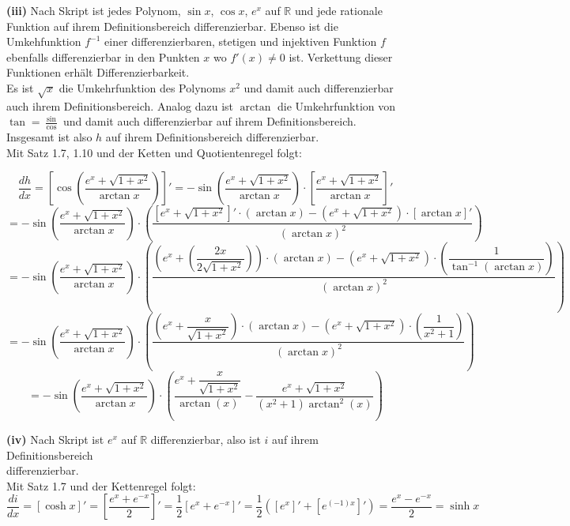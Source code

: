 \documentclass[a4paper,graphics,11pt]{article}
\begin{document}
\textbf{(iii)}
Nach Skript ist jedes Polynom, $\sin x$, $\cos x$, $e^x$ auf $\mathbb{R}$ und jede rationale Funktion auf ihrem
Definitionsbereich differenzierbar. Ebenso ist die Umkehfunktion $f^{-1}$ einer differenzierbaren, stetigen und
injektiven Funktion $f$ ebenfalls differenzierbar in den Punkten $x$ wo $f'(x) \neq 0$ ist. Verkettung dieser
Funktionen erhält Differenzierbarkeit.\\
Es ist $\sqrt{x}$ die Umkehrfunktion des Polynoms $x^2$ und damit auch differenzierbar auch ihrem Definitionsbereich.
Analog dazu ist $\arctan$ die Umkehrfunktion von $\tan = \frac{\sin}{\cos}$ und damit auch differenzierbar
auf ihrem Definitionsbereich. Insgesamt ist also $h$ auf ihrem Definitionsbereich differenzierbar.\\
Mit Satz 1.7, 1.10 und der Ketten und Quotientenregel folgt:

$$
    \frac{dh}{dx} = \left[\cos\left(\frac{e^x+\sqrt{1+x^2}}{\arctan x}\right)\right]'
    = -\sin\left(\frac{e^x+\sqrt{1+x^2}}{\arctan x}\right) \cdot
        \left[\frac{e^x+\sqrt{1+x^2}}{\arctan x}\right]'
$$$$
    = -\sin\left(\frac{e^x+\sqrt{1+x^2}}{\arctan x}\right) \cdot
        \left(\frac{\left[e^x+\sqrt{1+x^2}\right]'\cdot (\arctan x) -
        (e^x+\sqrt{1+x^2}) \cdot [\arctan x]'}{(\arctan x)^2} \right)
$$$$
    = -\sin\left(\frac{e^x+\sqrt{1+x^2}}{\arctan x}\right) \cdot
        \left(\frac{\left(e^x+\left(\dfrac{2x}{2\sqrt{1+x^2}}\right)\right)\cdot (\arctan x) -
        (e^x+\sqrt{1+x^2}) \cdot \left(\dfrac{1}{\tan^{-1}(\arctan x)}\right)}{(\arctan x)^2} \right)
$$$$
    = -\sin\left(\frac{e^x+\sqrt{1+x^2}}{\arctan x}\right) \cdot
        \left(\frac{\left(e^x+\dfrac{x}{\sqrt{1+x^2}}\right)\cdot (\arctan x) -
        (e^x+\sqrt{1+x^2}) \cdot \left(\dfrac{1}{x^2+1}\right)}{(\arctan x)^2}
        \right)
$$$$
    = -\sin\left(\frac{e^x+\sqrt{1+x^2}}{\arctan x}\right) \cdot
        \left(\frac{e^x+\dfrac{x}{\sqrt{1+x^2}}}{\arctan(x)} - \frac{e^x+\sqrt{1+x^2}}{(x^2+1)\arctan^2(x)}\right)
$$

\textbf{(iv)}
Nach Skript ist $e^x$ auf $\mathbb{R}$ differenzierbar, also ist $i$ auf ihrem Definitionsbereich\\
differenzierbar.\\
Mit Satz 1.7 und der Kettenregel folgt:
$$
    \frac{di}{dx} = [\cosh x]'
    = \left[\frac{e^x+e^{-x}}{2}\right]'
    = \frac{1}{2} \left[e^x+e^{-x}\right]'
    = \frac{1}{2} \left([e^x]' + [e^{(-1)x}]'\right)
    = \frac{e^x-e^{-x}}{2}
    = \sinh x
$$
\end{document}
